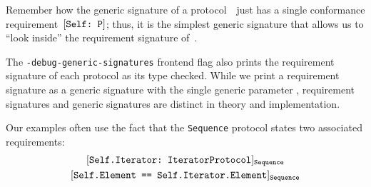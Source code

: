 \documentclass[../generics]{subfiles}
\begin{document}
Remember how the generic signature of a protocol~\tP\ just has a single conformance requirement~$[\texttt{Self:~P}]$; thus, it is the simplest generic signature that allows us to ``look inside'' the requirement signature of~\tP.

The \texttt{-debug-generic-signatures} frontend flag also prints the requirement signature of each protocol as its type checked. While we print a requirement signature as a generic signature with the single generic parameter \tSelf, requirement signatures and generic signatures are distinct in theory and implementation.

Our examples often use the fact that the \texttt{Sequence} protocol states two associated requirements:
\begin{gather*}
\AssocConfReq{Self.Iterator}{IteratorProtocol}{Sequence}\\
\AssocSameReq{Self.Element}{Self.Iterator.Element}{Sequence}
\end{gather*}
\end{document}
